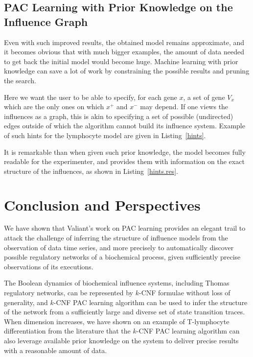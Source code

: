 \documentclass{llncs}
\begin{document}
\subsection{PAC Learning with Prior Knowledge on the Influence Graph}
\label{sec:prior}

Even with such improved results, the obtained model remains approximate, and
it becomes obvious that with much bigger examples, the amount of data needed
to get back the initial model would become huge.
Machine learning with prior knowledge can save a lot of work by constraining the possible results and pruning the search.

Here we want the user to be able to specify, for each gene $x$, a set of gene $V_x$ which are the only ones on which $x^+$ and $x^-$ may depend. If one views the influences as a graph, this is akin to specifying a set of possible (undirected) edges outside of which the algorithm cannot build its influence system. Example of such hints for the lymphocyte model are given in Listing~\ref{hints}. 

It is remarkable than when given such prior knowledge, the model becomes fully readable for the experimenter, and provides them with information on the exact structure of the influences, as shown in Listing~\ref{hints.res}.




\section{Conclusion and Perspectives}

We have shown that Valiant's work on PAC learning provides an elegant trail 
to attack the challenge of inferring the structure of influence models from the observation of data time series,
and more precisely to automatically discover possible regulatory networks of a biochemical process, given sufficiently precise observations of its executions.

The Boolean dynamics of biochemical influence systems, including Thomas regulatory networks, can be represented by $k$-CNF formulae without loss of generality,
and $k$-CNF PAC learning algorithm can be used to infer the structure of the network from
a sufficiently large and diverse set of state transition traces.
When dimension increases, we have shown on an example of T-lymphocyte differentiation from the literature
that the $k$-CNF PAC learning algorithm can also leverage available
prior knowledge on the system to deliver precise results with a reasonable
amount of data.
\end{document}

